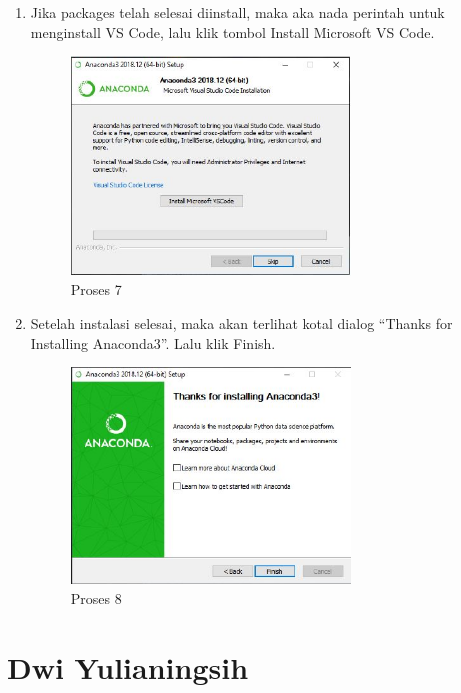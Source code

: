 \begin{itemize}
\begin{enumerate}
\item Jika packages telah selesai diinstall, maka aka nada perintah untuk menginstall VS Code, lalu klik tombol Install Microsoft VS Code.
\begin{figure}[ht]
	\centerline{\includegraphics[width=0.70\textwidth]{figures/Rahma/g.JPG}}
	\caption{Proses 7}
	\label{gambar7 }
\end{figure}

\item Setelah instalasi selesai, maka akan terlihat kotal dialog “Thanks for Installing Anaconda3”. Lalu klik Finish.
\begin{figure}[ht]
	\centerline{\includegraphics[width=0.70\textwidth]{figures/Rahma/h.JPG}}
	\caption{Proses 8}
	\label{gambar8 }
\end{figure}
	    \end{enumerate}
\end{itemize}

\section{Dwi Yulianingsih}
